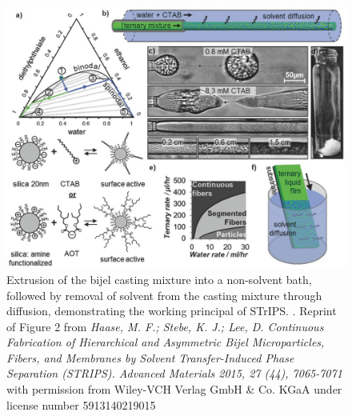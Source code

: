 \begin{figure}
    \centering
    \includegraphics[scale = 5]{figures/introduction/STrIPS.jpg}
    \caption{Extrusion of the bijel casting mixture into a non-solvent bath, followed by removal of solvent from 
             the casting mixture through diffusion, demonstrating the working principal of STrIPS. \cite{haase_continuous_2015}. 
             Reprint of Figure 2 from 
             \textit{Haase, M. F.; Stebe, K. J.; Lee, D. Continuous Fabrication of Hierarchical and Asymmetric Bijel Microparticles, Fibers, and Membranes by Solvent Transfer-Induced Phase Separation (STRIPS). Advanced Materials 2015, 27 (44), 7065-7071}
             with permission from Wiley-VCH Verlag GmbH \& Co. KGaA under license number 5913140219015}
    \label{fig:strips}
\end{figure}


